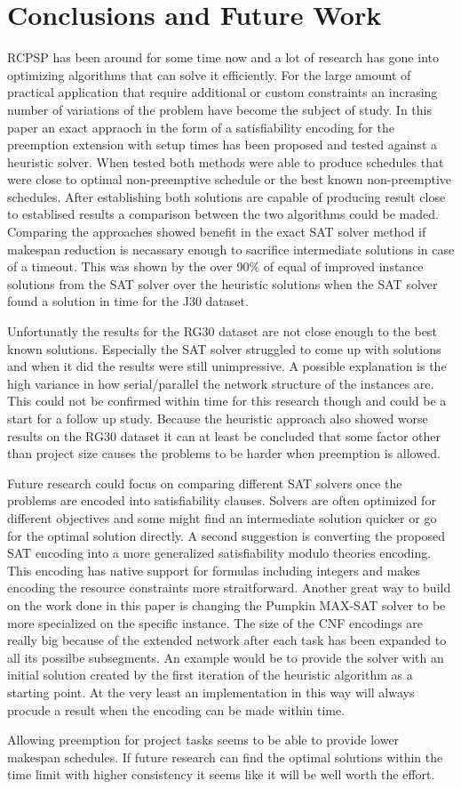 \section{Conclusions and Future Work}
RCPSP has been around for some time now and a lot of research has gone into optimizing algorithms that can solve it efficiently. For the large amount of practical application that require additional or custom constraints an incrasing number of variations of the problem have become the subject of study. In this paper an exact appraoch in the form of a satisfiability encoding for the preemption extension with setup times has been proposed and tested against a heuristic solver. When tested both methods were able to produce schedules that were close to optimal non-preemptive schedule or the best known non-preemptive schedules. After establishing both solutions are capable of producing result close to establised results a comparison between the two algorithms could be maded. Comparing the approaches showed benefit in the exact SAT solver method if makespan reduction is necassary enough to sacrifice intermediate solutions in case of a timeout. This was shown by the over 90\% of equal of improved instance solutions from the SAT solver over the heuristic solutions when the SAT solver found a solution in time for the J30 dataset.

Unfortunatly the results for the RG30 dataset are not close enough to the best known solutions. Especially the SAT solver struggled to come up with solutions and when it did the results were still unimpressive. A possible explanation is the high variance in how serial/parallel the network structure of the instances are. This could not be confirmed within time for this research though and could be a start for a follow up study. Because the heuristic approach also showed worse results on the RG30 dataset it can at least be concluded that some factor other than project size causes the problems to be harder when preemption is allowed.

Future research could focus on comparing different SAT solvers once the problems are encoded into satisfiability clauses. Solvers are often optimized for different objectives and some might find an intermediate solution quicker or go for the optimal solution directly. A second suggestion is converting the proposed SAT encoding into a more generalized satisfiability modulo theories encoding. This encoding has native support for formulas including integers and makes encoding the resource constraints more straitforward. Another great way to build on the work done in this paper is changing the Pumpkin MAX-SAT solver to be more specialized on the specific instance. The size of the CNF encodings are really big because of the extended network after each task has been expanded to all its possilbe subsegments. An example would be to provide the solver with an initial solution created by the first iteration of the heuristic algorithm as a starting point. At the very least an implementation in this way will always procude a result when the encoding can be made within time.

Allowing preemption for project tasks seems to be able to provide lower makespan schedules. If future research can find the optimal solutions within the time limit with higher consistency it seems like it will be well worth the effort.